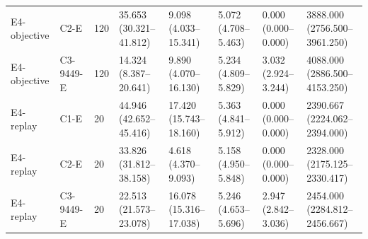 \begin{tabular}{llllllll}
E4-objective & C2-E & 120 & 35.653 (30.321--41.812) & 9.098 (4.033--15.341) & 5.072 (4.708--5.463) & 0.000 (0.000--0.000) & 3888.000 (2756.500--3961.250) \\
E4-objective & C3-9449-E & 120 & 14.324 (8.387--20.641) & 9.890 (4.070--16.130) & 5.234 (4.809--5.829) & 3.032 (2.924--3.244) & 4088.000 (2886.500--4153.250) \\
E4-replay & C1-E & 20 & 44.946 (42.652--45.416) & 17.420 (15.743--18.160) & 5.363 (4.841--5.912) & 0.000 (0.000--0.000) & 2390.667 (2224.062--2394.000) \\
E4-replay & C2-E & 20 & 33.826 (31.812--38.158) & 4.618 (4.370--9.093) & 5.158 (4.950--5.848) & 0.000 (0.000--0.000) & 2328.000 (2175.125--2330.417) \\
E4-replay & C3-9449-E & 20 & 22.513 (21.573--23.078) & 16.078 (15.316--17.038) & 5.246 (4.653--5.696) & 2.947 (2.842--3.036) & 2454.000 (2284.812--2456.667) \\
\hline
\end{tabular}
